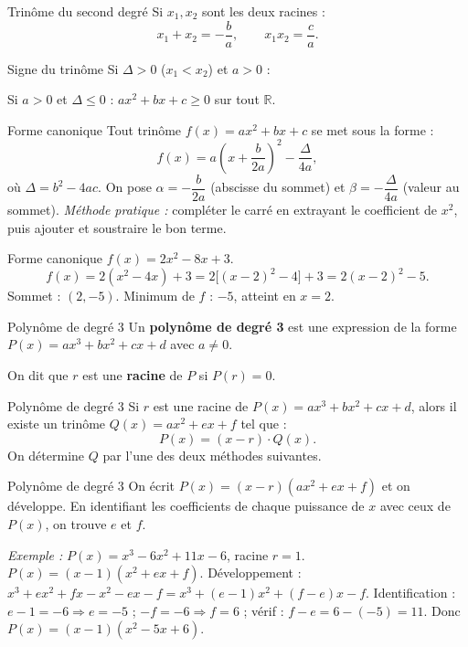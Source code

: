 \documentclass[aspectratio=169,10pt]{beamer}
\begin{document}
\begin{frame}{Trinôme du second degré}
Si \(x_1, x_2\) sont les deux racines :
\[x_1 + x_2 = -\dfrac{b}{a},\qquad x_1 x_2 = \dfrac{c}{a}.\]
\end{frame}
\begin{frame}{Signe du trinôme}
Si \(\Delta > 0\) (\(x_1 < x_2\)) et \(a > 0\) :

Si \(a > 0\) et \(\Delta \leq 0\) : \(ax^2+bx+c \geq 0\) sur tout \(\mathbb{R}\).
\end{frame}
\begin{frame}{Forme canonique}
Tout trinôme \(f(x)=ax^2+bx+c\) se met sous la forme :
\[f(x) = a\!\left(x + \dfrac{b}{2a}\right)^2 - \dfrac{\Delta}{4a},\]
où \(\Delta = b^2 - 4ac\). On pose \(\alpha = -\dfrac{b}{2a}\) (abscisse du sommet)
et \(\beta = -\dfrac{\Delta}{4a}\) (valeur au sommet).
\emph{Méthode pratique :} compléter le carré en extrayant le coefficient
de \(x^2\), puis ajouter et soustraire le bon terme.
\end{frame}
\begin{frame}{Forme canonique}
\(f(x) = 2x^2 - 8x + 3\).
\[f(x) = 2(x^2 - 4x) + 3 = 2\bigl[(x-2)^2 - 4\bigr] + 3
       = 2(x-2)^2 - 5.\]
Sommet : \((2, -5)\). Minimum de \(f\) : \(-5\), atteint en \(x=2\).
\end{frame}
\begin{frame}{Polynôme de degré 3}
Un \textbf{polynôme de degré 3} est une expression de la forme
\(P(x) = ax^3 + bx^2 + cx + d\) avec \(a \ne 0\).

On dit que \(r\) est une \textbf{racine} de \(P\) si \(P(r) = 0\).
\end{frame}
\begin{frame}{Polynôme de degré 3}
Si \(r\) est une racine de \(P(x) = ax^3+bx^2+cx+d\), alors il existe un
trinôme \(Q(x) = ax^2 + ex + f\) tel que :
\[P(x) = (x - r)\cdot Q(x).\]
On détermine \(Q\) par l'une des deux méthodes suivantes.
\end{frame}
\begin{frame}{Polynôme de degré 3}
On écrit \(P(x) = (x-r)(ax^2+ex+f)\) et on développe.
En identifiant les coefficients de chaque puissance de \(x\) avec ceux de \(P(x)\),
on trouve \(e\) et \(f\).

\emph{Exemple :} \(P(x) = x^3 - 6x^2 + 11x - 6\), racine \(r=1\).
\(P(x) = (x-1)(x^2+ex+f)\).
Développement : \(x^3 + ex^2 + fx - x^2 - ex - f
= x^3 + (e-1)x^2 + (f-e)x - f\).
Identification : \(e-1 = -6 \Rightarrow e=-5\) ;
\(-f = -6 \Rightarrow f=6\) ; vérif : \(f-e = 6-(-5)=11\).
Donc \(P(x) = (x-1)(x^2-5x+6)\).
\end{frame}
\end{document}
